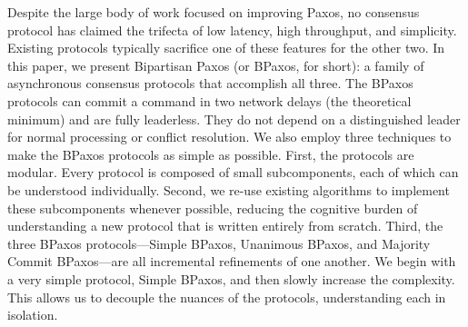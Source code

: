 Despite the large body of work focused on improving Paxos, no consensus
protocol has claimed the trifecta of low latency, high throughput, and
simplicity. Existing protocols typically sacrifice one of these features for
the other two. In this paper, we present Bipartisan Paxos (or BPaxos, for
short): a family of asynchronous consensus protocols that accomplish all three.
The BPaxos protocols can commit a command in two network delays (the
theoretical minimum) and are fully leaderless. They do not depend on a
distinguished leader for normal processing or conflict resolution. We also
employ three techniques to make the BPaxos protocols as simple as possible.
%
First, the protocols are modular. Every protocol is composed of small
subcomponents, each of which can be understood individually.
%
Second, we re-use existing algorithms to implement these subcomponents whenever
possible, reducing the cognitive burden of understanding a new protocol that is
written entirely from scratch.
%
Third, the three BPaxos protocols---Simple BPaxos, Unanimous BPaxos, and
Majority Commit BPaxos---are all incremental refinements of one another. We
begin with a very simple protocol, Simple BPaxos, and then slowly increase the
complexity. This allows us to decouple the nuances of the protocols,
understanding each in isolation.
